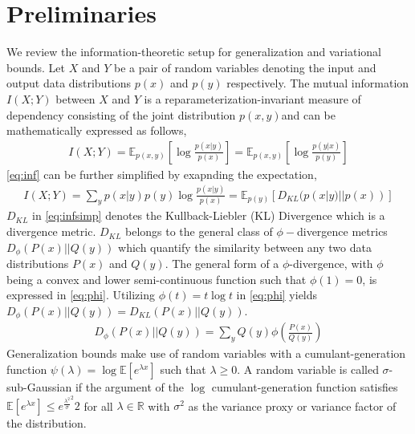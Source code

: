 \documentclass{article}
\begin{document}
\section{Preliminaries}
We review the information-theoretic setup for generalization and variational bounds. Let $X$ and $Y$ be a pair of random variables denoting the input and output data distributions $p(x)$ and $p(y)$ respectively. The mutual information $I(X;Y)$ between $X$ and $Y$ is a reparameterization-invariant measure of dependency consisting of the joint distribution $p(x,y)$and can be mathematically expressed as follows,
\begin{gather}
  I(X;Y) = \mathbb{E}_{p(x,y)}[\log\frac{p(x|y)}{p(x)}] = \mathbb{E}_{p(x,y)}[\log\frac{p(y|x)}{p(y)}] \label{eq:inf}
\end{gather}
\autoref{eq:inf} can be further simplified by exapnding the expectation, 
\begin{gather}
  I(X;Y) = \sum_{y}p(x|y)p(y)\log\frac{p(x|y)}{p(x)} = \mathbb{E}_{p(y)}[D_{KL}(p(x|y)||p(x))] \label{eq:infsimp}
\end{gather}
$D_{KL}$ in \autoref{eq:infsimp} denotes the Kullback-Liebler (KL) Divergence \cite{kl} which is a divergence metric. $D_{KL}$ belongs to the general class of $\phi-$divergence metrics $D_{\phi}(P(x)||Q(y))$ which quantify the similarity between any two data distributions $P(x)$ and $Q(y)$. The general form of a $\phi$-divergence, with $\phi$ being a convex and lower semi-continuous function such that $\phi(1)=0$, is expressed in \autoref{eq:phi}. Utilizing $\phi(t)=t\log t$ in \autoref{eq:phi} yields $D_{\phi}(P(x)||Q(y))=D_{KL}(P(x)||Q(y))$.
\begin{gather}
  D_{\phi}(P(x)||Q(y)) = \sum_{y}Q(y)\phi(\frac{P(x)}{Q(y)}) \label{eq:phi}
\end{gather}   
Generalization bounds make use of random variables with a cumulant-generation \cite{cover} function $\psi(\lambda) = \log\mathbb{E}[e^{\lambda x}]$ such that $\lambda \geq 0$. A random variable is called $\sigma$-sub-Gaussian if the argument of the $\log$ cumulant-generation function satisfies $\mathbb{E}[e^{\lambda x}] \leq e^{\frac{\lambda^{2}}\sigma^{2}}{2}$ for all $\lambda \in \mathbb{R}$ with $\sigma^{2}$ as the variance proxy or variance factor of the distribution.  
\end{document}
